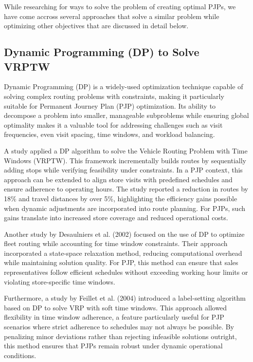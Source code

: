 While researching for ways to solve the problem of creating optimal PJPs, we have come accross several approaches that solve a similar problem while optimizing other objectives that are discussed in detail below.

\subsection{Dynamic Programming (DP) to Solve VRPTW}
Dynamic Programming (DP) is a widely-used optimization technique capable of solving complex routing problems with constraints, making it particularly suitable for Permanent Journey Plan (PJP) optimization. Its ability to decompose a problem into smaller, manageable subproblems while ensuring global optimality makes it a valuable tool for addressing challenges such as visit frequencies, even visit spacing, time windows, and workload balancing.

A study \cite{articleDP} applied a DP algorithm to solve the Vehicle Routing Problem with Time Windows (VRPTW). This framework incrementally builds routes by sequentially adding stops while verifying feasibility under constraints. In a PJP context, this approach can be extended to align store visits with predefined schedules and ensure adherence to operating hours. The study reported a reduction in routes by 18\% and travel distances by over 5\%, highlighting the efficiency gains possible when dynamic adjustments are incorporated into route planning. For PJPs, such gains translate into increased store coverage and reduced operational costs.

Another study by Desaulniers et al. (2002) \cite{Desaulniers2002} focused on the use of DP to optimize fleet routing while accounting for time window constraints. Their approach incorporated a state-space relaxation method, reducing computational overhead while maintaining solution quality. For PJP, this method can ensure that sales representatives follow efficient schedules without exceeding working hour limits or violating store-specific time windows.

Furthermore, a study by Feillet et al. (2004) \cite{Feillet2004} introduced a label-setting algorithm based on DP to solve VRP with soft time windows. This approach allowed flexibility in time window adherence, a feature particularly useful for PJP scenarios where strict adherence to schedules may not always be possible. By penalizing minor deviations rather than rejecting infeasible solutions outright, this method ensures that PJPs remain robust under dynamic operational conditions.

